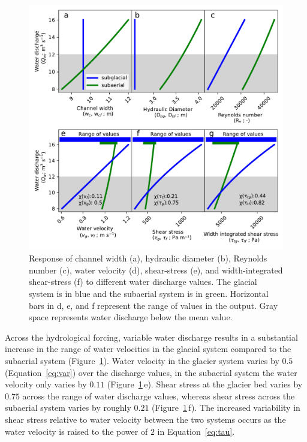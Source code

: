 \documentclass[draft]{agujournal2019}
\begin{document}
  \begin{center}
    \begin{figure}[H]
      \includegraphics[width=0.8\linewidth]{model_outputs.pdf}
      \caption{Response of channel width (a), hydraulic diameter (b),  Reynolds number  (c),  water velocity (d), shear-stress (e), and width-integrated shear-stress (f)  to different water discharge values. The glacial system is in blue and the subaerial system is in green.  Horizontal bars in d, e, and f represent the range of values in the  output. Gray space represents water discharge below the mean value. }
      \label{fig:model_outs}
    \end{figure}
  \end{center}
  
  Across the hydrological forcing, variable water discharge results in a substantial increase in the range of water velocities in the glacial system compared to the subaerial system (Figure~\ref{fig:model_outs}).
  Water velocity in the glacier system varies by  $0.5$ (Equation~\ref{eq:var}) over the discharge values, in the subaerial system the water velocity only varies by $0.11$ (Figure~\ref{fig:model_outs}\,e).
  Shear stress at the glacier bed varies by $0.75$ across the range of water discharge values, whereas shear stress across the subaerial system varies by roughly $0.21$ (Figure~\ref{fig:model_outs}\,f). The increased variability in shear stress relative to water velocity between the two systems occurs as the water velocity is raised to the power of $2$ in Equation~\ref{eq:tau}. 
  
\end{document}
